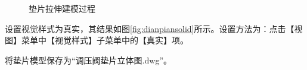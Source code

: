 \begin{procedure}
\begin{figure}[htbp]
\centering
{}\hspace{20pt}
\hspace{20pt}
\caption{垫片拉伸建模过程}
\end{figure}
\item 设置视觉样式为真实，其结果如图\ref{fig:dianpiansolid}所示。设置方法为：点击【视图】菜单中【视觉样式】子菜单中的【真实】项。
\item 将垫片模型保存为“调压阀垫片立体图.dwg”。
\end{procedure}

\endinput